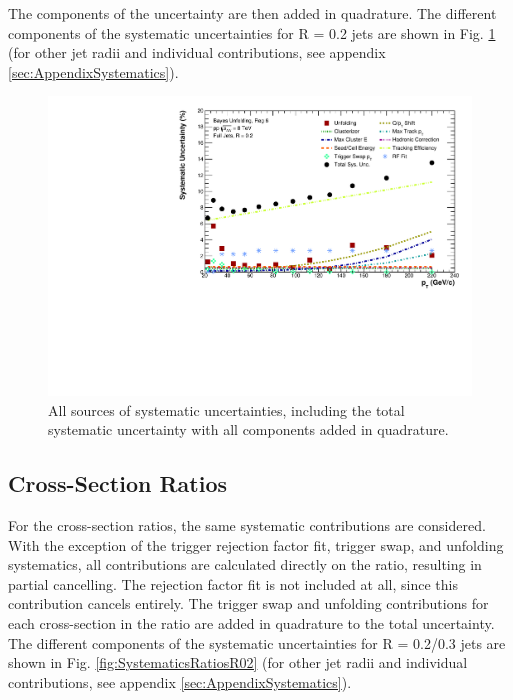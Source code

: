 \documentclass[ALICE]{ALICE_analysis_notes}
\begin{document}
The components of the uncertainty are then added in quadrature. The different components of the systematic uncertainties for R = 0.2 jets are shown in Fig. \ref{fig:SystematicsSpectraR02} (for other jet radii and individual contributions, see appendix \ref{sec:AppendixSystematics}).

\begin{figure}
    \centering
    \includegraphics[width=15cm]{figures/Systematics/TotalSystematics_R02.pdf}
    \caption{All sources of systematic uncertainties, including the total systematic uncertainty with all components added in quadrature.}
    \label{fig:SystematicsSpectraR02}
\end{figure}

\subsection{Cross-Section Ratios}
\label{sec:SystematicsRatios}

For the cross-section ratios, the same systematic contributions are considered. With the exception of the trigger rejection factor fit, trigger swap, and unfolding systematics, all contributions are calculated directly on the ratio, resulting in partial cancelling. The rejection factor fit is not included at all, since this contribution cancels entirely. The trigger swap and unfolding contributions for each cross-section in the ratio are added in quadrature to the total uncertainty. The different components of the systematic uncertainties for R = 0.2/0.3 jets are shown in Fig. \ref{fig:SystematicsRatiosR02} (for other jet radii and individual contributions, see appendix \ref{sec:AppendixSystematics}).
\end{document}
